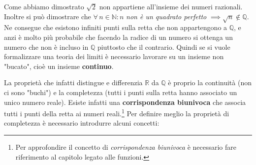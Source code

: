 Come abbiamo dimostrato $\sqrt{2}$ non appartiene all'insieme dei numeri razionali. Inoltre si può dimostrare che $\forall\, n \in \mathbb{N} : n$ \textit{non è un quadrato perfetto} $\implies \sqrt{n} \notin \mathbb{Q}$.
Ne consegue che esistono infiniti punti sulla retta che non appartengono a $\mathbb{Q}$, e anzi è molto più probabile che facendo la radice di un numero si ottenga un numero che non è incluso in $\mathbb{Q}$ piuttosto che il contrario. Quindi se si vuole formalizzare una teoria dei limiti è necessario lavorare su un insieme non "bucato", cioè un insieme \textbf{continuo}.\bigbreak

La proprietà che infatti distingue e differenzia $\mathbb{R}$ da $\mathbb{Q}$ è proprio la continuità (non ci sono "buchi") e la completezza (tutti i punti sulla retta hanno associato un unico numero reale). Esiste infatti una \textbf{corrispondenza biunivoca} che associa tutti i punti della retta ai numeri reali.\footnote{Per approfondire il concetto di \textit{corrispondenza biunivoca} è necessario fare riferimento al capitolo legato alle funzioni.}
Per definire meglio la proprietà di completezza è necessario introdurre alcuni concetti:


